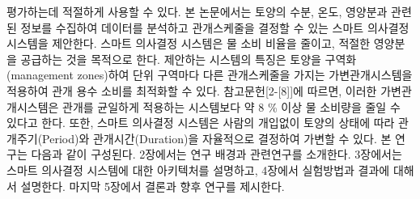\documentclass[11pt]{article}
\begin{document}
평가하는데 적절하게 사용할 수 있다. 본 논문에서는 토양의 수분, 온도, 영양분과 관련된 정보를 수집하여 데이터를 분석하고 관개스케줄을 결정할 수 있는 스마트 의사결정 시스템을 제안한다. 스마트 의사결정 시스템은 물 소비 비율을 줄이고, 적절한 영양분을 공급하는 것을 목적으로 한다. 제안하는 시스템의 특징은 토양을 구역화(management zones)하여 단위 구역마다 다른 관개스케줄을 가지는 가변관개시스템을 적용하여 관개 용수 소비를 최적화할 수 있다. 참고문헌[2-[8]]에 따르면, 이러한 가변관개시스템은 관개를 균일하게 적용하는 시스템보다 약 8 \% 이상 물 소비량을 줄일 수 있다고 한다. 또한, 스마트 의사결정 시스템은 사람의 개입없이 토양의 상태에 따라 관개주기(Period)와 관개시간(Duration)을 자율적으로 결정하여 가변할 수 있다. 본 연구는 다음과 같이 구성된다. 2장에서는 연구 배경과 관련연구를 소개한다. 3장에서는 스마트 의사결정 시스템에 대한 아키텍처를 설명하고, 4장에서 실험방법과 결과에 대해서 설명한다. 마지막 5장에서 결론과 향후 연구를 제시한다.
\end{document}
